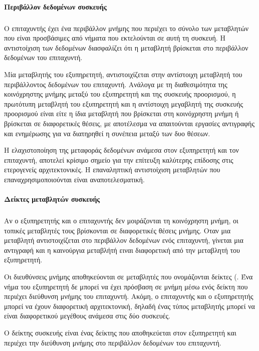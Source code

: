 \paragraph{Περιβάλλον δεδομένων συσκευής}
\subparagraph{}
Ο επιταχυντής έχει ένα περιβάλλον μνήμης που περιέχει το σύνολο των μεταβλητών που είναι προσβάσιμες από νήματα που εκτελούνται σε αυτή τη συσκευή. Η αντιστοίχιση των δεδομένων διασφαλίζει ότι η μεταβλητή βρίσκεται στο περιβάλλον δεδομένων του επιταχυντή.

Μία μεταβλητής του εξυπηρετητή, αντιστοιχίζεται στην αντίστοιχη μεταβλητή του περιβάλλοντος δεδομένων του επιταχυντή.
Ανάλογα με τη διαθεσιμότητα της κοινόχρηστης μνήμης μεταξύ του εξυπηρετητή \emph{} και της συσκευής προορισμού, η πρωτότυπη μεταβλητή του εξυπηρετητή και η αντίστοιχη μεγαβλητή της συσκευής προορισμού είναι είτε η ίδια μεταβλητή που βρίσκεται στη κοινόχρηστη μνήμη ή βρίσκεται σε διαφορετικές θέσεις, με αποτέλεσμα να απαιτούνται εργασίες αντιγραφής και ενημέρωσης για να διατηρηθεί η συνέπεια μεταξύ των δυο θέσεων.

Η ελαχιστοποίηση της μεταφοράς δεδομένων ανάμεσα στον εξυπηρετητή και τον επιταχυντή, αποτελεί κρίσιμο σημείο για την επίτευξη καλύτερης επίδοσης στις ετερογενείς αρχιτεκτονικές.
Η επαναληπτική αντιστοίχιση μεταβλητών που επαναχρησιμοποιούνται είναι αναποτελεσματική.

\paragraph{Δείκτες μεταβλητών συσκευής}
\subparagraph{}
Αν ο εξυπηρετητής και ο επιταχυντής δεν μοιράζονται τη κοινόχρηστη μνήμη, οι τοπικές μεταβλητές τους βρίσκονται σε διαφορετικές θέσεις μνήμης. Οταν μια μεταβλητή αντιστοιχίζεται στο περιβάλλον δεδομένων ενός επιταχυντή, γίνεται μια αντιγραφή και η καινούργια μεταβλήτή ειναι διαφορετική από την μεταβλητή του εξυπηρετητή.

Οι διευθύνσεις μνήμης αποθηκεύονται σε μεταβλητές που ονομάζονται δείκτες (\emph{}. Ένα νήμα του εξυπηρετητή δε μπορεί να έχει πρόσβαση σε μνήμη μέσω ενός δείκτη που περιέχει διεύθυνση μνήμης του επιταχυντή. Ακόμη, ο επιταχυντής και ο εξυπηρετητής μπορεί να έχουν διαφορετική αρχιτεκτονική, δηλαδή ένας τύπος μεταβλητής μπορεί να είναι διαφορετικού μεγέθους ανάμεσα στις δύο συσκευές.

Ο δείκτης συσκευής \emph{} είναι ένας δείκτης που αποθηκεύεται στον εξυπηρετητή και περιέχει την διεύθυνση μνήμης στο περιβάλλον δεδομένων του επιταχυντή.


